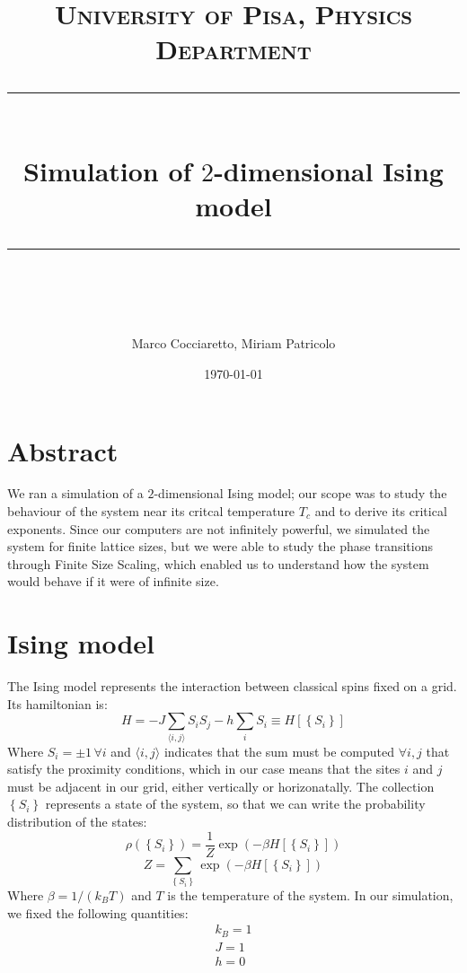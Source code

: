 \documentclass[11pt]{scrartcl} %
\title{	
	\normalfont\normalsize
	\textsc{University of Pisa, Physics Department}\\ %
	\vspace{25pt} %
	\rule{\linewidth}{0.5pt}\\ %
	\vspace{20pt} %
	{\huge Simulation of $2$-dimensional Ising model}\\ %
	\vspace{12pt} %
	\rule{\linewidth}{2pt}\\ %
	\vspace{12pt} %
}
\author{\LARGE Marco Cocciaretto,  \LARGE Miriam Patricolo} %
\date{\normalsize\today} %
\begin{document}
\maketitle

\section*{Abstract}
We ran a simulation of a $2$-dimensional Ising model; our scope was to study the behaviour of the system near its critcal temperature $T_c$ and to derive its critical exponents. Since our computers are not infinitely powerful, we simulated the system for finite lattice sizes, but we were able to study the phase transitions through Finite Size Scaling, which enabled us to understand how the system would behave if it were of infinite size.

\section{Ising model}
The Ising model represents the interaction between classical spins fixed on a grid. Its hamiltonian is:
\begin{equation}
	\label{ising}
	H = -J \sum _{\langle i,j \rangle} S_i S_j - h\sum_i S_i \equiv H\left[\left\{S_i\right\}\right]
\end{equation}
Where $S_i =\pm 1\, \forall i$ and $\langle i,j \rangle$ indicates that the sum must be computed $\forall i,j$ that satisfy the proximity conditions, which in our case means that the sites $i$ and $j$ must be adjacent in our grid, either vertically or horizonatally. The collection $\left\{S_i\right\}$ represents a state of the system, so that we can write the probability distribution of the states:
\begin{equation}
\label{distribution}
\rho\left(\left\{S_i\right\}\right) = \frac{1}{Z} \exp \left(-\beta H\left[\left\{S_i\right\}\right]\right)
\end{equation}
\begin{equation}
Z = \sum_{\left\{S_i\right\}} \exp \left(-\beta H\left[\left\{S_i\right\}\right]\right)
\end{equation}
Where $\beta = 1/(k_B T)$ and $T$ is the temperature of the system. In our simulation, we fixed the following quantities:
\begin{equation}
	\label{choice}
	\begin{array}{c}
		k_B = 1 \\
		J = 1 \\
		h = 0
	\end{array}
\end{equation}
\end{document}
